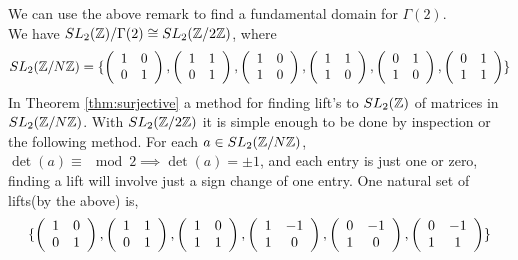 \begin{example}
We can use the above remark to find a fundamental domain for $\Gamma(2)$. \\
We have $\sltz /\Gamma(2) \cong \sltznz[2]$, where
$$\sltznz = \{ \left(\begin{array}{ c c }  1 & 0 \\ 0 & 1 \end{array} \right),  \left(\begin{array}{ c c }  1 & 1 \\ 0 & 1 \end{array} \right),  \left(\begin{array}{ c c }  1 & 0 \\ 1 & 0 \end{array} \right),  \left(\begin{array}{ c c }  1 & 1 \\ 1 & 0 \end{array} \right),  \left(\begin{array}{ c c }  0 & 1 \\ 1 & 0 \end{array} \right),  \left(\begin{array}{ c c }  0 & 1 \\ 1 & 1 \end{array} \right) \}  $$
In Theorem \ref{thm:surjective} a method for finding lift's to $\sltz$ of matrices in $\sltznz$. With $\sltznz[2]$ it is simple enough to be done by inspection or the following method. For each $a \in \sltznz$, $\det(a) \equiv \mod 2 \implies \det(a) = \pm 1$, and each entry is just one or zero, finding a lift will involve just a sign change of one entry. One natural set of lifts(by the above) is, 
$$\{\left(\begin{array}{ c c }  1 & 0 \\ 0 & 1 \end{array} \right),  \left(\begin{array}{ c c }  1 & 1 \\ 0 & 1 \end{array} \right),  \left(\begin{array}{ c c }  1 & 0 \\ 1 & 1 \end{array} \right),  \left(\begin{array}{ c c }  1 & -1 \\ 1 & 0 \end{array} \right),  \left(\begin{array}{ c c }  0 & -1 \\ 1 & 0 \end{array} \right),  \left(\begin{array}{ c c }  0 & -1 \\ 1 & 1 \end{array} \right) \} $$

\end{example}
